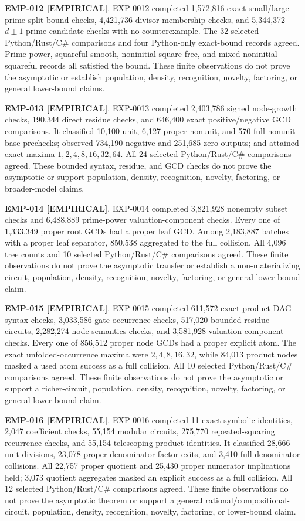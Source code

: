 \documentclass[11pt]{article}
\newcommand{\claimstatus}[2]{\textbf{#1 [#2]}}
\begin{document}
\claimstatus{EMP-012}{EMPIRICAL}. EXP-0012 completed 1,572,816 exact
small/large-prime split-bound checks, 4,421,736 divisor-membership checks, and
5,344,372 \(d\pm1\) prime-candidate checks with no counterexample. The 32
selected Python/Rust/C\# comparisons and four Python-only exact-bound records
agreed. Prime-power, squareful smooth, noninitial square-free, and mixed
noninitial squareful records all satisfied the bound. These finite
observations do not prove the asymptotic or establish population, density,
recognition, novelty, factoring, or general lower-bound claims.

\claimstatus{EMP-013}{EMPIRICAL}. EXP-0013 completed 2,403,786 signed
node-growth checks, 190,344 direct residue checks, and 646,400 exact
positive/negative GCD comparisons. It classified 10,100 unit, 6,127 proper
nonunit, and 570 full-nonunit base prechecks; observed 734,190 negative and
251,685 zero outputs; and attained exact maxima
\(1,2,4,8,16,32,64\). All 24 selected Python/Rust/C\# comparisons agreed.
These bounded syntax, residue, and GCD checks do not prove the asymptotic or
support population, density, recognition, novelty, factoring, or
broader-model claims.

\claimstatus{EMP-014}{EMPIRICAL}. EXP-0014 completed 3,821,928 nonempty
subset checks and 6,488,889 prime-power valuation-component checks. Every
one of 1,333,349 proper root GCDs had a proper leaf GCD. Among 2,183,887
batches with a proper leaf separator, 850,538 aggregated to the full
collision. All 4,096 tree counts and 10 selected Python/Rust/C\# comparisons
agreed. These finite observations do not prove the asymptotic transfer or
establish a non-materializing circuit, population, density, recognition,
novelty, factoring, or general lower-bound claim.

\claimstatus{EMP-015}{EMPIRICAL}. EXP-0015 completed 611,572 exact product-DAG
syntax checks, 3,033,586 gate occurrence checks, 517,020 bounded residue
circuits, 2,282,274 node-semantics checks, and 3,581,928 valuation-component
checks. Every one of 856,512 proper node GCDs had a proper explicit atom.
The exact unfolded-occurrence maxima were \(2,4,8,16,32\), while 84,013
product nodes masked a used atom success as a full collision. All 10 selected
Python/Rust/C\# comparisons agreed. These finite observations do not prove the
asymptotic or support a richer-circuit, population, density, recognition,
novelty, factoring, or general lower-bound claim.

\claimstatus{EMP-016}{EMPIRICAL}. EXP-0016 completed 11 exact symbolic
identities, 2,047 coefficient checks, 55,154 modular circuits, 275,770
repeated-squaring recurrence checks, and 55,154 telescoping product
identities. It classified 28,666 unit divisions, 23,078 proper denominator
factor exits, and 3,410 full denominator collisions. All 22,757 proper
quotient and 25,430 proper numerator implications held; 3,073 quotient
aggregates masked an explicit success as a full collision. All 12 selected
Python/Rust/C\# comparisons agreed. These finite observations do not prove
the asymptotic theorem or support a general rational/compositional-circuit,
population, density, recognition, novelty, factoring, or lower-bound claim.
\end{document}
